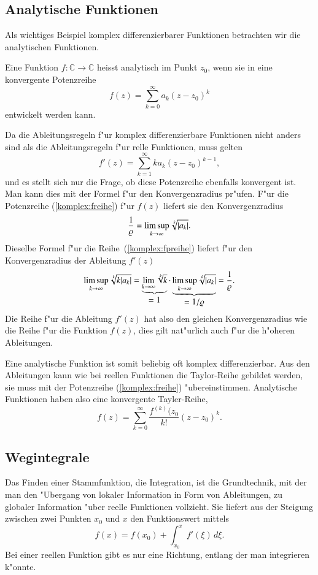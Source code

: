 %
%
\subsection{Analytische Funktionen}
Als wichtiges Beispiel komplex differenzierbarer Funktionen betrachten
wir die analytischen Funktionen.
\begin{definition}
Eine Funktion $f\colon\mathbb C\to\mathbb C$ heisst analytisch im Punkt
$z_0$, wenn sie in eine konvergente Potenzreihe
\begin{equation}
f(z)=\sum_{k=0}^\infty a_k(z-z_0)^k
\label{komplex:freihe}
\end{equation}
entwickelt werden kann.
\end{definition}

Da die Ableitungsregeln f"ur komplex differenzierbare Funktionen nicht
anders sind als die Ableitungsregeln f"ur relle Funktionen, muss gelten
\begin{equation}
f'(z)=\sum_{k=1}^\infty ka_k(z-z_0)^{k-1},
\label{komplex:fpreihe}
\end{equation}
und es stellt sich nur die Frage, ob diese Potenzreihe ebenfalls konvergent
ist.
Man kann dies mit der Formel f"ur den Konvergenzradius pr"ufen.
F"ur die Potenzreihe (\ref{komplex:freihe}) f"ur $f(z)$ liefert sie den
Konvergenzradius
\[
\frac{1}{\varrho} = \limsup_{k\to\infty} \root{k}\of{|a_k|}.
\]
Dieselbe Formel f"ur die Reihe~(\ref{komplex:fpreihe}) liefert
f"ur den Konvergenzradius der Ableitung $f'(z)$
\[
\limsup_{k\to\infty} \root{k}\of{k|a_k|}
=
\underbrace{\lim_{k\to\infty} \root{k}\of{k}}_{\textstyle=1}
\cdot
\underbrace{ \limsup_{k\to\infty} \root{k}\of{|a_k|}}_{\textstyle=1/\varrho}
=
\frac1{\varrho}.
\]
Die Reihe f"ur die Ableitung $f'(z)$ hat also den gleichen Konvergenzradius
wie die Reihe f"ur die Funktion $f(z)$, dies gilt nat"urlich auch f"ur
die h"oheren Ableitungen.

Eine analytische Funktion ist somit beliebig oft komplex differenzierbar.
Aus den Ableitungen kann wie bei reellen Funktionen die Taylor-Reihe
gebildet werden, sie muss mit der Potenzreihe (\ref{komplex:freihe})
"ubereinstimmen.
Analytische Funktionen haben also eine konvergente Tayler-Reihe,
\[
f(z) = \sum_{k=0}^\infty \frac{f^{(k)}(z_0}{k!}(z-z_0)^k.
\]

%
%
\subsection{Wegintegrale}
Das Finden einer Stammfunktion, die Integration, ist die Grundtechnik,
mit der man den "Ubergang von lokaler Information in Form von Ableitungen,
zu globaler Information "uber reelle Funktionen vollzieht.
Sie liefert aus der Steigung zwischen zwei Punkten $x_0$ und $x$ den
Funktionswert mittels
\[
f(x)=f(x_0)+\int_{x_0}^xf'(\xi)\,d\xi.
\]
Bei einer reellen Funktion gibt es nur eine Richtung, entlang der man
integrieren k"onnte.

